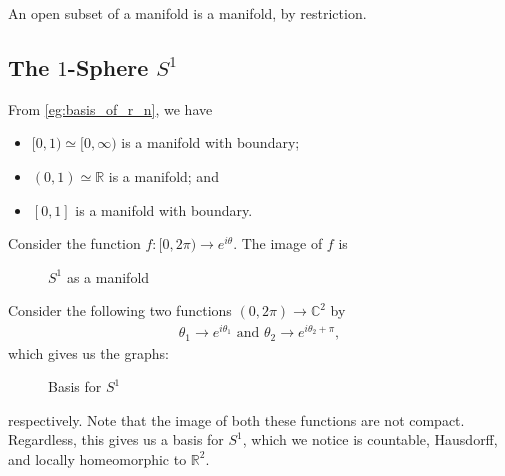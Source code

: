 \documentclass[notoc,notitlepage]{tufte-book}
\begin{document}
\begin{note}
  An open subset of a manifold is a manifold, by restriction.
\end{note}

\subsection{The $1$-Sphere $S^1$}%
\label{sub:the_1_sphere_s_1_}

From \cref{eg:basis_of_r_n}, we have
\begin{itemize}
  \item $[0, 1) \simeq [0, \infty)$ is a manifold with boundary;
  \item $(0, 1) \simeq \mathbb{R}$ is a manifold; and
  \item $[0, 1]$ is a manifold with boundary.
\end{itemize}

\begin{eg}[$S^1$ is a manifold]
  Consider the function $f : [0, 2 \pi) \to e^{i \theta}$. The image of $f$ is
  \begin{figure}[ht]
    \centering
    \caption{$S^1$ as a manifold}
    \label{fig:s_1_as_a_manifold}
  \end{figure}
  Consider the following two functions $(0, 2\pi) \to \mathbb{C}^2$ by
  \begin{gather*}
    \theta_1 \to e^{i \theta_1} \text{ and } \theta_2 \to e^{i \theta_2 + \pi},
  \end{gather*}
  which gives us the graphs:
  \begin{figure}[ht]
    \centering
    \caption{Basis for $S^1$}
    \label{fig:basis_for__s_1_}
  \end{figure}

  \noindent
  respectively. Note that the image of both these functions are not compact.
  Regardless, this gives us a basis for $S^1$, which we notice is countable,
  Hausdorff, and locally homeomorphic to $\mathbb{R}^2$.
\end{eg}
\end{document}
